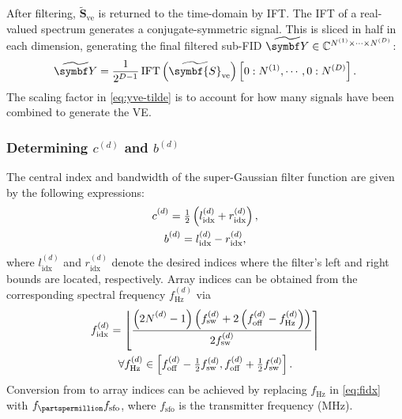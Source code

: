 After filtering, $\widetilde{\symbf{S}}_{\text{ve}}$ is returned to the
time-domain by \ac{IFT}. The \ac{IFT} of a real-valued spectrum generates a
conjugate-symmetric signal. This is sliced in half in each dimension,
generating the final filtered sub-FID $\widetilde{\bY} \in
\mathbb{C}^{\None \times \cdots \times \ND}$:
\begin{equation}
    \widetilde{\bY} =
        \frac{1}{2^{D-1}}
        \IFT\left(\widetilde{\symbf{S}}_{\text{ve}}\right)
        \left[0:\None, \cdots, 0:\ND\right].
        \label{eq:yve-tilde}
\end{equation}
The scaling factor in \eqref{eq:yve-tilde} is to account for how many signals
have been combined to generate the \ac{VE}.

\subsubsection{Determining $c^{(d)}$ and  $b^{(d)}$}
The central index and bandwidth of the super-Gaussian filter function are given by the following expressions:
\begin{subequations}
    \begin{gather}
        c_{\vphantom{\text{idx}}}^{(d)} = \tfrac{1}{2} \left(l^{(d)}_{\text{idx}} + r^{(d)}_{\text{idx}}\right), \\
        b_{\vphantom{\text{idx}}}^{(d)} = l^{(d)}_{\text{idx}} - r^{(d)}_{\text{idx}},
    \end{gather}
\end{subequations}
where $l^{(d)}_{\text{idx}}$ and $r^{(d)}_{\text{idx}}$ denote the desired
indices where the filter's left and right bounds are located, respectively.
Array indices can be obtained from the corresponding spectral frequency
$f^{(d)}_{\unit{\hertz}}$ via
\begin{equation}
    \begin{gathered}
        f_{\text{idx}}^{(d)} =
            \left \lfloor
                \frac
                {
                    \left(2 \Nd_{\vphantom{d}} - 1\right)
                    \left(\fswd + 2 \left(\foffd - f_{\unit{\hertz}}^{(d)}\right) \right)
                }
                {2 \fswd}
            \right \rceil \\
        \forall f^{(d)}_{\unit{\hertz}} \in
            \left[\foffd - \tfrac{1}{2} \fswd, \foffd + \tfrac{1}{2} \fswd\right].
        \label{eq:fidx}
    \end{gathered}
\end{equation}
Conversion from \unit{\partspermillion} to array indices can be achieved by
replacing  $f_{\unit{\hertz}}$ in \eqref{eq:fidx} with
$f_{\unit{\partspermillion}} f_{\text{sfo}}$, where $f_{\text{sfo}}$ is the
transmitter frequency (\unit{\mega \hertz}).

